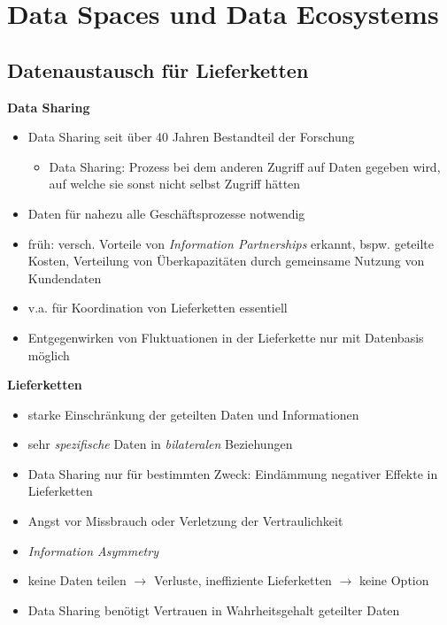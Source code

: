 
\section{Data Spaces und Data Ecosystems}

\subsection{Datenaustausch für Lieferketten}

\textbf{Data Sharing}
\begin{itemize}
    \item Data Sharing seit über 40 Jahren Bestandteil der Forschung
    \begin{itemize}
        \item Data Sharing: Prozess bei dem anderen Zugriff auf Daten gegeben wird, auf welche sie sonst nicht selbst Zugriff hätten
    \end{itemize}
    \item Daten für nahezu alle Geschäftsprozesse notwendig
    \item früh: versch. Vorteile von \emph{Information Partnerships} erkannt, bspw. geteilte Kosten, Verteilung von Überkapazitäten durch gemeinsame Nutzung von Kundendaten
    \item v.a. für Koordination von Lieferketten essentiell
    \item Entgegenwirken von Fluktuationen in der Lieferkette nur mit Datenbasis möglich~\cite{mollerIndustrialDataEcosystems2024}
\end{itemize}

\vspace{1cm}

\textbf{Lieferketten}
\begin{itemize}
    \item starke Einschränkung der geteilten Daten und Informationen
    \item sehr \emph{spezifische} Daten in \emph{bilateralen} Beziehungen
    \item Data Sharing nur für bestimmten Zweck: Eindämmung negativer Effekte in Lieferketten
    \item Angst vor Missbrauch oder Verletzung der Vertraulichkeit
    \item \emph{Information Asymmetry}
    \item keine Daten teilen $\to$ Verluste, ineffiziente Lieferketten $\to$ keine Option
    \item Data Sharing benötigt Vertrauen in Wahrheitsgehalt geteilter Daten~\cite{mollerIndustrialDataEcosystems2024}
\end{itemize}


